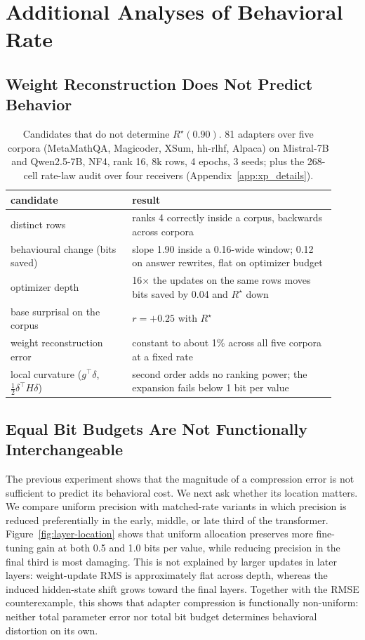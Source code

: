 \section{Additional Analyses of Behavioral Rate}

\subsection{Weight Reconstruction Does Not Predict Behavior}
\begin{table}[t]
\caption{Candidates that do not determine $R^\star(0.90)$. 81 adapters over five corpora (MetaMathQA, Magicoder, XSum, hh-rlhf, Alpaca) on Mistral-7B and Qwen2.5-7B, NF4, rank 16, 8k rows, 4 epochs, 3 seeds; plus the 268-cell rate-law audit over four receivers (Appendix~\ref{app:xp_details}).}
\label{tab:not-rstar}
\centering
\small
\begin{tabular}{p{0.34\linewidth}p{0.58\linewidth}}
\toprule
candidate & result \\
\midrule
distinct rows & ranks 4 correctly inside a corpus, backwards across corpora \\
behavioural change (bits saved) & slope 1.90 inside a 0.16-wide window; 0.12 on answer rewrites, flat on optimizer budget \\
optimizer depth & 16$\times$ the updates on the same rows moves bits saved by 0.04 and $R^\star$ down \\
base surprisal on the corpus & $r=+0.25$ with $R^\star$ \\
weight reconstruction error & constant to about 1\% across all five corpora at a fixed rate \\
local curvature ($g^\top\delta$, $\tfrac12\delta^\top H\delta$) & second order adds no ranking power; the expansion fails below 1 bit per value \\
\bottomrule
\end{tabular}
\end{table}

\subsection{Equal Bit Budgets Are Not Functionally Interchangeable}
\label{app:layer-location}

The previous experiment shows that the magnitude of a compression error is
not sufficient to predict its behavioral cost. We next ask whether its
location matters. We compare uniform precision with matched-rate variants in
which precision is reduced preferentially in the early, middle, or late third
of the transformer.
\newline
Figure~\ref{fig:layer-location} shows that uniform allocation preserves more
fine-tuning gain at both 0.5 and 1.0 bits per value, while reducing precision
in the final third is most damaging. This is not explained by larger updates
in later layers: weight-update RMS is approximately flat across depth, whereas
the induced hidden-state shift grows toward the final layers.
\newline
Together with the RMSE counterexample, this shows that adapter compression is
functionally non-uniform: neither total parameter error nor total bit budget
determines behavioral distortion on its own. 

